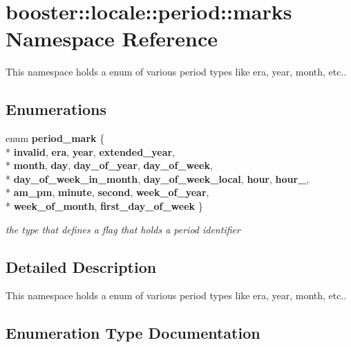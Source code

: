 \section{booster\-:\-:locale\-:\-:period\-:\-:marks Namespace Reference}
\label{namespacebooster_1_1locale_1_1period_1_1marks}


This namespace holds a enum of various period types like era, year, month, etc..  


\subsection*{Enumerations}
\begin{DoxyCompactItemize}
\item 
enum {\bf period\-\_\-mark} \{ \\*
{\bf invalid}, 
{\bf era}, 
{\bf year}, 
{\bf extended\-\_\-year}, 
\\*
{\bf month}, 
{\bf day}, 
{\bf day\-\_\-of\-\_\-year}, 
{\bf day\-\_\-of\-\_\-week}, 
\\*
{\bf day\-\_\-of\-\_\-week\-\_\-in\-\_\-month}, 
{\bf day\-\_\-of\-\_\-week\-\_\-local}, 
{\bf hour}, 
{\bf hour\-\_}, 
\\*
{\bf am\-\_\-pm}, 
{\bf minute}, 
{\bf second}, 
{\bf week\-\_\-of\-\_\-year}, 
\\*
{\bf week\-\_\-of\-\_\-month}, 
{\bf first\-\_\-day\-\_\-of\-\_\-week}
 \}
\begin{DoxyCompactList}\small\item\em the type that defines a flag that holds a period identifier \end{DoxyCompactList}\end{DoxyCompactItemize}


\subsection{Detailed Description}
This namespace holds a enum of various period types like era, year, month, etc.. 

\subsection{Enumeration Type Documentation}

